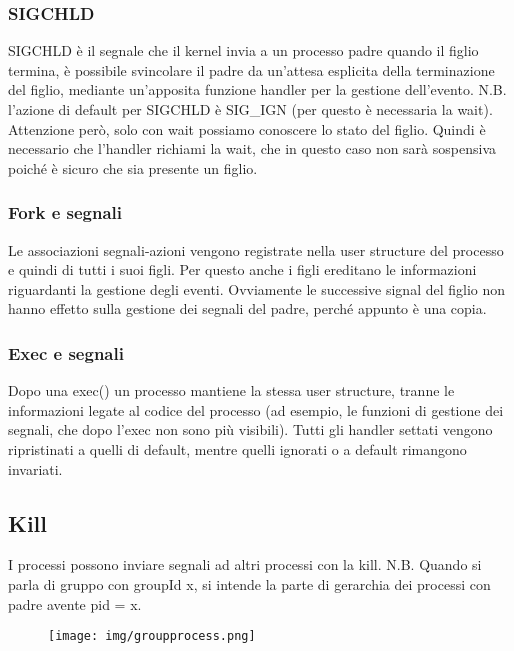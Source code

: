 \documentclass{article}
\begin{document}
\subsubsection{SIGCHLD}
SIGCHLD è il segnale che il kernel invia a
un processo padre quando il figlio termina, è possibile
svincolare il padre da un'attesa esplicita della terminazione 
del figlio, mediante un'apposita funzione handler per la
gestione dell'evento. N.B. l'azione di default per
SIGCHLD è SIG\_IGN (per questo è necessaria la wait).
Attenzione però, solo con wait possiamo conoscere lo stato
del figlio. Quindi è necessario che l'handler richiami la wait, 
che in questo caso non sarà sospensiva poiché è sicuro che sia presente
un figlio.

\subsubsection{Fork e segnali}
Le associazioni segnali-azioni vengono registrate nella user structure 
del processo e quindi di tutti i suoi figli.  Per questo anche i figli 
ereditano le informazioni riguardanti la gestione degli 
eventi. Ovviamente le successive signal del figlio non hanno 
effetto sulla gestione dei segnali del padre, perché appunto è 
una copia.

\subsubsection{Exec e segnali}
Dopo una exec() un processo mantiene la stessa user structure,  
tranne le informazioni legate al codice del processo (ad 
esempio, le funzioni di gestione dei segnali, che dopo l'exec
non sono più visibili). Tutti gli handler settati
vengono ripristinati a quelli di default, mentre quelli 
ignorati o a default rimangono invariati.

\subsection{Kill}
\noindent {}
\medskip

\noindent I processi possono inviare segnali ad altri 
processi con la kill. N.B. Quando si parla di gruppo con groupId x, si intende la parte di gerarchia dei processi con
padre avente pid = x.


\begin{figure}[h!]
    \begin{center}
        \texttt{[image: img/groupprocess.png]}      \end{center}
\end{figure}
\end{document}
